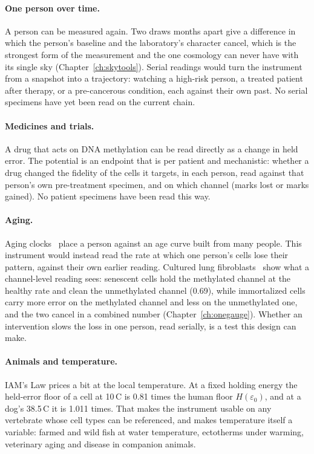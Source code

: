 \paragraph{One person over time.} A person can be measured again. Two draws months apart give a difference in which the person's baseline and
the laboratory's character cancel, which is the strongest form of the measurement and the one cosmology can never have with its single sky
(Chapter~\ref{ch:skytools}). Serial readings would turn the instrument from a snapshot into a trajectory: watching a high-risk person, a
treated patient after therapy, or a pre-cancerous condition, each against their own past. \prediction{} No serial specimens have yet been read
on the current chain.

\paragraph{Medicines and trials.} A drug that acts on DNA methylation can be read directly as a change in held error. The potential is an endpoint that is per patient and mechanistic: whether a drug changed
the fidelity of the cells it targets, in each person, read against that person's own pre-treatment specimen, and on which channel (marks lost
or marks gained). No patient specimens have been read this way. \openprob

\paragraph{Aging.} Aging clocks~\cite{Horvath2013} place a person against an age curve built from many people. This instrument would instead read the
rate at which one person's cells lose their pattern, against their own earlier reading. Cultured lung fibroblasts~\cite{Cruickshanks2013} show what a channel-level
reading sees: senescent cells hold the methylated channel at the healthy rate and clean the unmethylated channel (0.69), while immortalized
cells carry more error on the methylated channel and less on the unmethylated one, and the two cancel in a combined number
(Chapter~\ref{ch:onegauge}). \measured{} Whether an intervention slows the loss in one person, read serially, is a test this design can make.
\prediction

\paragraph{Animals and temperature.} IAM's Law prices a bit at the local temperature. At a fixed holding energy the held-error floor of a cell
at 10\,\textdegree C is 0.81 times the human floor $H(\varepsilon_0)$, and at a dog's 38.5\,\textdegree C it is 1.011 times. \calc{} That makes the
instrument usable on any vertebrate whose cell types can be referenced, and makes temperature itself a variable: farmed and wild fish at
water temperature, ectotherms under warming, veterinary aging and disease in companion animals. \prediction

